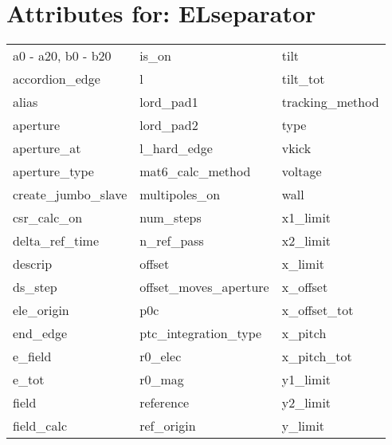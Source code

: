  \vfill
 
 \section{Attributes for: ELseparator}
 \label{s:list.elseparator}
 
 \begin{tabular}{lll} \toprule
a0 - a20, b0 - b20          & is_on                       & tilt                        \\
accordion_edge              & l                           & tilt_tot                    \\
alias                       & lord_pad1                   & tracking_method             \\
aperture                    & lord_pad2                   & type                        \\
aperture_at                 & l_hard_edge                 & vkick                       \\
aperture_type               & mat6_calc_method            & voltage                     \\
create_jumbo_slave          & multipoles_on               & wall                        \\
csr_calc_on                 & num_steps                   & x1_limit                    \\
delta_ref_time              & n_ref_pass                  & x2_limit                    \\
descrip                     & offset                      & x_limit                     \\
ds_step                     & offset_moves_aperture       & x_offset                    \\
ele_origin                  & p0c                         & x_offset_tot                \\
end_edge                    & ptc_integration_type        & x_pitch                     \\
e_field                     & r0_elec                     & x_pitch_tot                 \\
e_tot                       & r0_mag                      & y1_limit                    \\
field                       & reference                   & y2_limit                    \\
field_calc                  & ref_origin                  & y_limit                     \\

\end{tabular}
